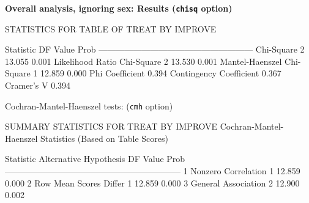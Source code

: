 \begin{frame}[fragile]
\bfseries{Overall analysis, ignoring sex}: Results (\texttt{chisq} option)
\begin{Output}[gobble=2]
             STATISTICS FOR TABLE OF TREAT BY IMPROVE

      Statistic                     DF     Value        Prob
      ------------------------------------------------------
      Chi-Square                     2    13.055       0.001
      Likelihood Ratio Chi-Square    2    13.530       0.001
      Mantel-Haenszel Chi-Square     1    12.859       0.000
      Phi Coefficient                      0.394
      Contingency Coefficient              0.367
      Cramer's V                           0.394
\end{Output}
Cochran-Mantel-Haenszel tests: (\texttt{cmh} option)
\begin{Output}[gobble=4]
               SUMMARY STATISTICS FOR TREAT BY IMPROVE
      Cochran-Mantel-Haenszel Statistics (Based on Table Scores)

    Statistic   Alternative Hypothesis    DF       Value      Prob
    --------------------------------------------------------------
       1        Nonzero Correlation        1      12.859     0.000
       2        Row Mean Scores Differ     1      12.859     0.000
       3        General Association        2      12.900     0.002
\end{Output}
\end{frame}

